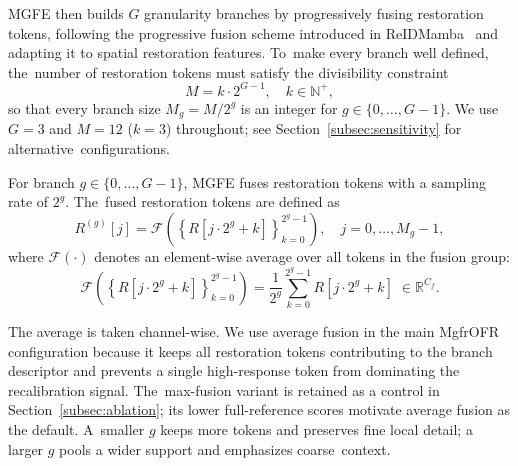 \documentclass[symmetry,article,accept,pdftex,moreauthors]{Definitions/mdpi}
\begin{document}
MGFE then builds $G$ granularity branches by progressively fusing restoration tokens, following the progressive fusion scheme introduced in ReIDMamba~\cite{gu2025reidmamba} and adapting it to spatial restoration features. To~make every branch well defined, the~number of restoration tokens must satisfy the divisibility constraint
\begin{equation}
M = k \cdot 2^{G-1},\quad k \in \mathbb{N}^{+},
\end{equation}
so that every branch size $M_g = M/2^g$ is an integer for $g\in\{0,\ldots,G-1\}$. We use $G=3$ and $M=12$ ($k=3$) throughout; see Section~\ref{subsec:sensitivity} for alternative~configurations.

For branch $g \in \{0,\ldots,G-1\}$, MGFE fuses restoration tokens with a sampling rate of $2^g$. The~fused restoration tokens are defined as
\begin{equation}
R^{(g)}[j] =
\mathcal{F}\!\left(
\left\{R[j{\cdot}2^g+k]\right\}_{k=0}^{2^g-1}
\right),\quad
j = 0,\ldots,M_g-1,
\end{equation}
where $\mathcal{F}(\cdot)$ denotes an element-wise average over all tokens in the fusion group:
\begin{equation}
\mathcal{F}\!\left(
\left\{R[j\cdot2^g+k]\right\}_{k=0}^{2^g-1}
\right)
= \frac{1}{2^g}\sum_{k=0}^{2^g-1} R[j\cdot2^g+k]\;\in\mathbb{R}^{C_f}.
\label{eq:avg_fusion}
\end{equation}

The average is taken channel-wise. We use average fusion in the main MgfrOFR configuration because it keeps all restoration tokens contributing to the branch descriptor and prevents a single high-response token from dominating the recalibration signal. The~max-fusion variant is retained as a control in Section~\ref{subsec:ablation}; its lower full-reference scores motivate average fusion as the default. A~smaller $g$ keeps more tokens and preserves fine local detail; a larger $g$ pools a wider support and emphasizes coarse~context.
\end{document}
